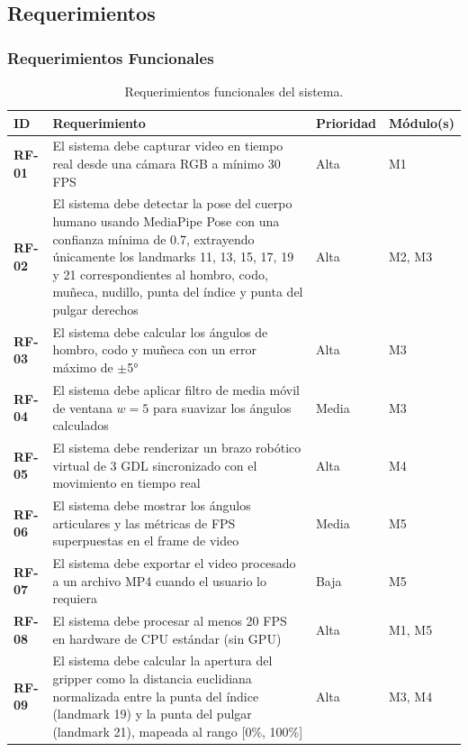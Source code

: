 \subsection{Requerimientos}

\subsubsection*{Requerimientos Funcionales}

\begin{table}[h!]
\centering
\label{tab:req_func}
\renewcommand{\arraystretch}{1.3}
\begin{tabularx}{\textwidth}{
    >{\bfseries}p{1.1cm}
    X
    p{1.6cm}
    p{2.2cm}
}
\toprule
\textbf{ID} &
\textbf{Requerimiento} &
\textbf{Prioridad} &
\textbf{Módulo(s)} \\
\midrule
RF-01 &
  El sistema debe capturar video en tiempo real desde una cámara RGB a
  mínimo 30 FPS &
  Alta & M1 \\
\midrule
RF-02 &
  El sistema debe detectar la pose del cuerpo humano usando MediaPipe
  Pose con una confianza mínima de 0.7, extrayendo únicamente los
  landmarks 11, 13, 15, 17, 19 y 21 correspondientes al hombro, codo,
  muñeca, nudillo, punta del índice y punta del pulgar derechos &
  Alta & M2, M3 \\
\midrule
RF-03 &
  El sistema debe calcular los ángulos de hombro, codo y muñeca con un
  error máximo de $\pm$5° &
  Alta & M3 \\
\midrule
RF-04 &
  El sistema debe aplicar filtro de media móvil de ventana $w = 5$
  para suavizar los ángulos calculados &
  Media & M3 \\
\midrule
RF-05 &
  El sistema debe renderizar un brazo robótico virtual de 3 GDL
  sincronizado con el movimiento en tiempo real &
  Alta & M4 \\
\midrule
RF-06 &
  El sistema debe mostrar los ángulos articulares y las métricas de FPS
  superpuestas en el frame de video &
  Media & M5 \\
\midrule
RF-07 &
  El sistema debe exportar el video procesado a un archivo MP4 cuando
  el usuario lo requiera &
  Baja & M5 \\
\midrule
RF-08 &
  El sistema debe procesar al menos 20 FPS en hardware de CPU estándar
  (sin GPU) &
  Alta & M1, M5 \\
\midrule
RF-09 &
El sistema debe calcular la apertura del gripper como la distancia euclidiana normalizada entre la punta del índice (landmark 19) y la punta del pulgar (landmark 21), mapeada al rango [0\%, 100\%] &
Alta & M3, M4 \\
\bottomrule
\end{tabularx}
\caption{Requerimientos funcionales del sistema.}
\end{table}

